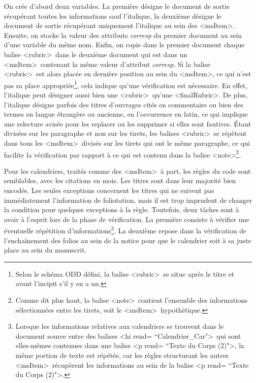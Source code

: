 \documentclass[a4paper,12pt,twoside]{book}
\begin{document}
On crée d'abord deux variables. La première désigne le document de sortie récupérant toutes les informations sauf l'italique, la deuxième désigne le document de sortie récupérant uniquement l'italique au sein des \textless msItem\textgreater . Ensuite, on stocke la valeur des attributs \textit{corresp} du premier document au sein d'une variable du même nom. Enfin, on copie dans le premier document chaque balise \textless rubric\textgreater~dans le deuxième document qui est dans un \textless msItem\textgreater~contenant la même valeur d'attribut \textit{corresp}. Si la balise \textless rubric\textgreater~est alors placée en dernière position au sein du \textless msItem\textgreater, ce qui n'est pas sa place appropriée\footnote{Selon le schéma ODD défini, la balise \textless rubric\textgreater~se situe après le titre et avant l'incipit s'il y en a un.}, cela indique qu'une vérification est nécessaire. En effet, l'italique peut désigner aussi bien une \textless rubric\textgreater~qu'une \textless finalRubric\textgreater. De plus, l'italique désigne parfois des titres d'ouvrages cités en commentaire ou bien des termes en langue étrangère ou ancienne, en l'occurrence en latin, ce qui implique une relecture avisée pour les replacer ou les supprimer si elles sont fautives. Étant divisées sur les paragraphe et non sur les tirets, les balises \textless rubric\textgreater~se répètent dans tous les \textless msItem\textgreater~divisés sur les tirets qui ont le même paragraphe, ce qui facilite la vérification par rapport à ce qui est contenu dans la balise \textless note\textgreater\footnote{Comme dit plus haut, la balise \textless note\textgreater~contient l'ensemble des informations sélectionnées entre les tirets, soit le \textless msItem\textgreater~hypothétique.}. 

Pour les calendriers, traités comme des \textless msItem\textgreater~à part, les règles du code sont semblables, avec les citations en mois. Les titres sont dans leur majorité bien encodés. Les seules exceptions concernent les titres qui ne suivent pas immédiatement l'information de foliotation, mais il est trop imprudent de changer la condition pour quelques exceptions à la règle. Toutefois, deux tâches sont à avoir à l'esprit lors de la phase de vérification. La première consiste à vérifier une éventuelle répétition d'informations\footnote{Lorsque les informations relatives aux calendriers se trouvent dans le document source entre des balises \textless hi rend= ``Calendrier\_Car"\textgreater~qui sont elles-mêmes contenues dans une balise \textless p rend= ``Texte du Corps (2)"\textgreater, la même portion de texte est répétée, car les règles structurant les autres \textless msItem\textgreater~récupèrent les informations au sein de la balise \textless p rend= ``Texte du Corps (2)"\textgreater .}. La deuxième repose dans la vérification de l'enchaînement des folios au sein de la notice pour que le calendrier soit à sa juste place au sein du manuscrit.
\end{document}
